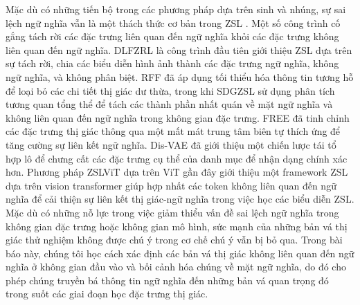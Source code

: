 Mặc dù có những tiến bộ trong các phương pháp dựa trên sinh và nhúng, sự sai lệch ngữ nghĩa vẫn là một thách thức cơ bản trong ZSL \cite{1, 4, 6, 9, 27, 30}. Một số công trình cố gắng tách rời các đặc trưng liên quan đến ngữ nghĩa khỏi các đặc trưng không liên quan đến ngữ nghĩa. DLFZRL \cite{46} là công trình đầu tiên giới thiệu ZSL dựa trên sự tách rời, chia các biểu diễn hình ảnh thành các đặc trưng ngữ nghĩa, không ngữ nghĩa, và không phân biệt. RFF \cite{27} đã áp dụng tối thiểu hóa thông tin tương hỗ để loại bỏ các chi tiết thị giác dư thừa, trong khi SDGZSL \cite{9} sử dụng phân tích tương quan tổng thể để tách các thành phần nhất quán về mặt ngữ nghĩa và không liên quan đến ngữ nghĩa trong không gian đặc trưng. FREE \cite{1} đã tinh chỉnh các đặc trưng thị giác thông qua một mất mát trung tâm biên tự thích ứng để tăng cường sự liên kết ngữ nghĩa. Dis-VAE \cite{30} đã giới thiệu một chiến lược tái tổ hợp lô để chưng cất các đặc trưng cụ thể của danh mục để nhận dạng chính xác hơn. Phương pháp ZSLViT dựa trên ViT gần đây \cite{4} giới thiệu một framework ZSL dựa trên vision transformer giúp hợp nhất các token không liên quan đến ngữ nghĩa để cải thiện sự liên kết thị giác-ngữ nghĩa trong việc học các biểu diễn ZSL. Mặc dù có những nỗ lực trong việc giảm thiểu vấn đề sai lệch ngữ nghĩa trong không gian đặc trưng hoặc không gian mô hình, sức mạnh của những bản vá thị giác thử nghiệm không được chú ý trong cơ chế chú ý vẫn bị bỏ qua. Trong bài báo này, chúng tôi học cách xác định các bản vá thị giác không liên quan đến ngữ nghĩa ở không gian đầu vào và bối cảnh hóa chúng về mặt ngữ nghĩa, do đó cho phép chúng truyền bá thông tin ngữ nghĩa đến những bản vá quan trọng đó trong suốt các giai đoạn học đặc trưng thị giác.
